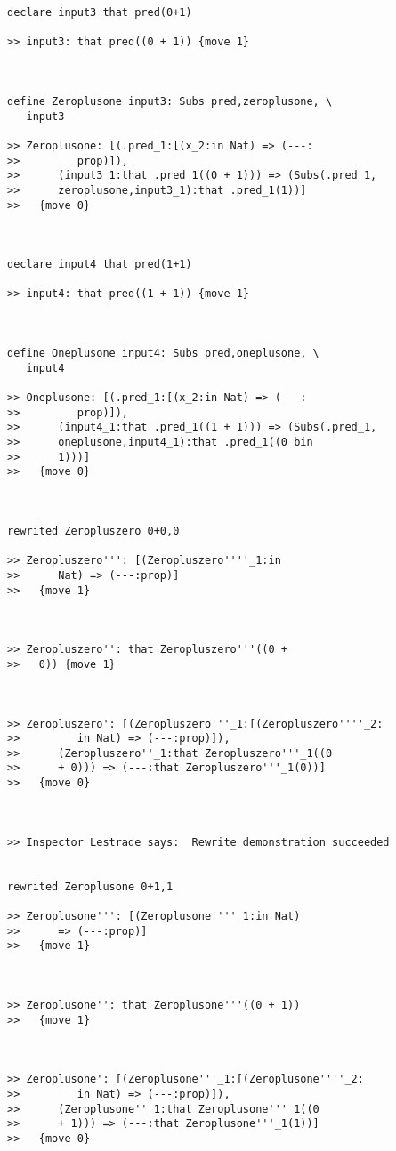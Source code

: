 \documentclass{article}
\begin{document}
\begin{verbatim}
declare input3 that pred(0+1)

>> input3: that pred((0 + 1)) {move 1}



define Zeroplusone input3: Subs pred,zeroplusone, \
   input3

>> Zeroplusone: [(.pred_1:[(x_2:in Nat) => (---:
>>         prop)]),
>>      (input3_1:that .pred_1((0 + 1))) => (Subs(.pred_1,
>>      zeroplusone,input3_1):that .pred_1(1))]
>>   {move 0}



declare input4 that pred(1+1)

>> input4: that pred((1 + 1)) {move 1}



define Oneplusone input4: Subs pred,oneplusone, \
   input4

>> Oneplusone: [(.pred_1:[(x_2:in Nat) => (---:
>>         prop)]),
>>      (input4_1:that .pred_1((1 + 1))) => (Subs(.pred_1,
>>      oneplusone,input4_1):that .pred_1((0 bin
>>      1)))]
>>   {move 0}



rewrited Zeropluszero 0+0,0

>> Zeropluszero''': [(Zeropluszero''''_1:in
>>      Nat) => (---:prop)]
>>   {move 1}



>> Zeropluszero'': that Zeropluszero'''((0 +
>>   0)) {move 1}



>> Zeropluszero': [(Zeropluszero'''_1:[(Zeropluszero''''_2:
>>         in Nat) => (---:prop)]),
>>      (Zeropluszero''_1:that Zeropluszero'''_1((0
>>      + 0))) => (---:that Zeropluszero'''_1(0))]
>>   {move 0}



>> Inspector Lestrade says:  Rewrite demonstration succeeded


rewrited Zeroplusone 0+1,1

>> Zeroplusone''': [(Zeroplusone''''_1:in Nat)
>>      => (---:prop)]
>>   {move 1}



>> Zeroplusone'': that Zeroplusone'''((0 + 1))
>>   {move 1}



>> Zeroplusone': [(Zeroplusone'''_1:[(Zeroplusone''''_2:
>>         in Nat) => (---:prop)]),
>>      (Zeroplusone''_1:that Zeroplusone'''_1((0
>>      + 1))) => (---:that Zeroplusone'''_1(1))]
>>   {move 0}




\end{verbatim}
\end{document}

